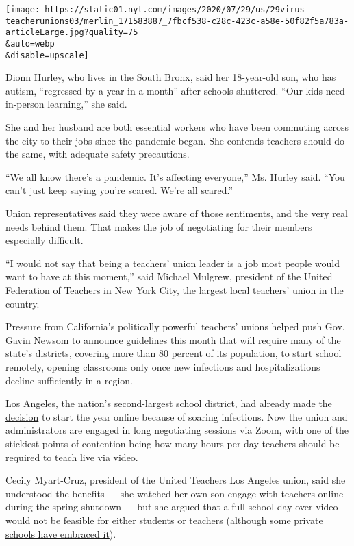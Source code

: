 \texttt{[image: https://static01.nyt.com/images/2020/07/29/us/29virus-teacherunions03/merlin\_171583887\_7fbcf538-c28c-423c-a58e-50f82f5a783a-articleLarge.jpg?quality=75\\\&auto=webp\\\&disable=upscale]}

Dionn Hurley, who lives in the South Bronx, said her 18-year-old son,
who has autism, ``regressed by a year in a month'' after schools
shuttered. ``Our kids need in-person learning,'' she said.

She and her husband are both essential workers who have been commuting
across the city to their jobs since the pandemic began. She contends
teachers should do the same, with adequate safety precautions.

``We all know there's a pandemic. It's affecting everyone,'' Ms. Hurley
said. ``You can't just keep saying you're scared. We're all scared.''

Union representatives said they were aware of those sentiments, and the
very real needs behind them. That makes the job of negotiating for their
members especially difficult.

``I would not say that being a teachers' union leader is a job most
people would want to have at this moment,'' said Michael Mulgrew,
president of the United Federation of Teachers in New York City, the
largest local teachers' union in the country.

Pressure from California's politically powerful teachers' unions helped
push Gov. Gavin Newsom to
\href{https://www.nytimes.com/2020/07/17/us/california-schools-reopening-newsom.html}{announce
guidelines this month} that will require many of the state's districts,
covering more than 80 percent of its population, to start school
remotely, opening classrooms only once new infections and
hospitalizations decline sufficiently in a region.

Los Angeles, the nation's second-largest school district, had
\href{https://www.nytimes.com/2020/07/13/us/lausd-san-diego-school-reopening.html}{already
made the decision} to start the year online because of soaring
infections. Now the union and administrators are engaged in long
negotiating sessions via Zoom, with one of the stickiest points of
contention being how many hours per day teachers should be required to
teach live via video.

Cecily Myart-Cruz, president of the United Teachers Los Angeles union,
said she understood the benefits --- she watched her own son engage with
teachers online during the spring shutdown --- but she argued that a
full school day over video would not be feasible for either students or
teachers (although
\href{https://www.nytimes.com/2020/05/09/us/coronavirus-public-private-school.html}{some
private schools have embraced it}).


